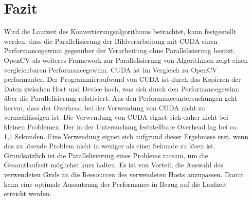 \documentclass{llncs}
\begin{document}
\section{Fazit}
%
Wird die Laufzeit des Konvertierungsalgorithmus betrachtet, kann festgestellt werden, dass die Parallelisierung der Bildverarbeitung mit CUDA einen Performancegewinn gegenüber der Verarbeitung ohne Parallelisierung besitzt. OpenCV als weiteres Framework zur Parallelisierung von Algorithmen zeigt einen vergleichbaren Performancegewinn. CUDA ist im Vergleich zu OpenCV performanter. Der Programmieraufwand von CUDA ist durch das Kopieren der Daten zwischen Host und Device hoch, was sich durch den Performancegewinn über die Parallelisierung relativiert. Aus den Performanceuntersuchungen geht hervor, dass der Overhead bei der Verwendung von CUDA nicht zu vernachlässigen ist. Die Verwendung von CUDA eignet sich daher nicht bei kleinen Problemen. Der in der Untersuchung feststellbare Overhead lag bei ca. 1,1 Sekunden. Eine Verwendung eignet sich aufgrund dieser Ergebnisse erst, wenn das zu lösende Problem nicht in weniger als einer Sekunde zu lösen ist. Grundsätzlich ist die Parallelisierung eines Problems ratsam, um die Gesamtlaufzeit möglichst kurz halten. Es ist von Vorteil, die Auswahl des verwendeten Grids an die Ressourcen des verwendeten Hosts anzupassen. Damit kann eine optimale Ausnutzung der Performance in Bezug auf die Laufzeit erreicht werden.\\
%
\end{document}
